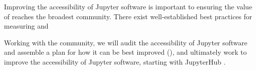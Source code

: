 \begin{task}[
  title=Accessibility in Jupyter,
  id=accessibility,
  lead=SRL,
  PM=12,
  wphases={12-36},
  partners={}
]

  Improving the accessibility of Jupyter software
  is important to ensuring the value of \TheProject reaches the broadest community.
  There exist well-established best practices for measuring and 

  Working with the community, we will audit the accessibility of Jupyter software and assemble a plan for how it can be best improved
  (),
  and ultimately work to improve the accessibility of Jupyter software,
  starting with JupyterHub .
\end{task}

